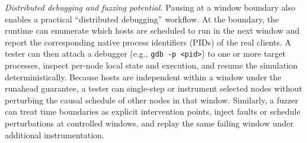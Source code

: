 \smallskip
\noindent\emph{Distributed debugging and fuzzing potential.}
Pausing at a window boundary also enables a practical ``distributed debugging'' workflow.
At the boundary, the runtime can enumerate which hosts are scheduled to run in the next window and report the corresponding native process identifiers (PIDs) of the real clients.
A tester can then attach a debugger (e.g., \texttt{gdb -p <pid>}) to one or more target processes, inspect per-node local state and execution, and resume the simulation deterministically.
Because hosts are independent within a window under the runahead guarantee, a tester can single-step or instrument selected nodes without perturbing the causal schedule of other nodes in that window.
Similarly, a fuzzer can treat time boundaries as explicit intervention points, inject faults or schedule perturbations at controlled windows, and replay the same failing window under additional instrumentation.
